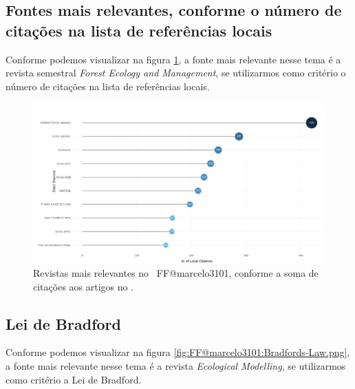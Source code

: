 \subsection{Fontes mais relevantes, conforme o número de citações na lista de referências locais}

Conforme podemos visualizar na figura \ref{fig:FF@marcelo3101:Most-Local-Cited-Sources(from-Reference-Lists).png}, a fonte mais relevante nesse tema é a revista semestral \textit{Forest Ecology and Management}, se utilizarmos como critério o número de citações na lista de referências locais.

\begin{figure}
    \centering
    \includegraphics[width=1\textwidth]{exploratory-data-analysis/marcelo3101/PesqBibliogr/ForestFire/WoS-20221204/assets/MostLocalCitedSourcesFFmarcelo3101.png}
    \caption{Revistas mais relevantes no  \dataset\ FF@marcelo3101, conforme a soma de citações aos artigos no \dataset.}
    \label{fig:FF@marcelo3101:Most-Local-Cited-Sources(from-Reference-Lists).png}
\end{figure}

\subsection{Lei de Bradford}

Conforme podemos visualizar na figura \ref{fig:FF@marcelo3101:Bradfords-Law.png}, a fonte mais relevante nesse tema é a revista \textit{Ecological Modelling}, se utilizarmos como critério a Lei de Bradford.

